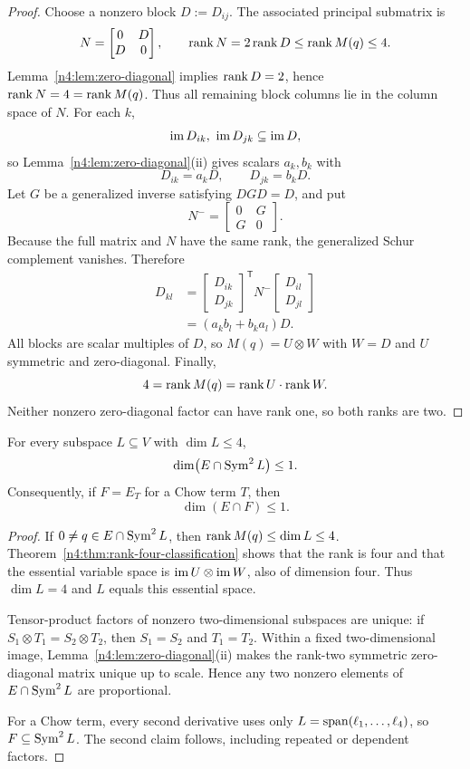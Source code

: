 \begin{proof}
Choose a nonzero block \(D:=D_{ij}\). The associated principal submatrix is
\[
  N=\begin{bmatrix}0&D\\D&0\end{bmatrix},
  \qquad \operatorname{rank} N=2\operatorname{rank} D\leq\operatorname{rank} M(q)\leq4.
\]
Lemma~\ref{n4:lem:zero-diagonal} implies \(\operatorname{rank} D=2\), hence
\(\operatorname{rank} N=4=\operatorname{rank} M(q)\). Thus all remaining block columns lie in the column
space of \(N\). For each \(k\),
\[
  \operatorname{im} D_{ik},\ \operatorname{im} D_{jk}\subseteq\operatorname{im} D,
\]
so Lemma~\ref{n4:lem:zero-diagonal}(ii) gives scalars \(a_k,b_k\) with
\[
  D_{ik}=a_kD,\qquad D_{jk}=b_kD.
\]
Let \(G\) be a generalized inverse satisfying \(DGD=D\), and put
\[
  N^-=\begin{bmatrix}0&G\\G&0\end{bmatrix}.
\]
Because the full matrix and \(N\) have the same rank, the generalized Schur
complement vanishes. Therefore
\begin{align*}
  D_{kl}
  &=\begin{bmatrix}D_{ik}\\D_{jk}\end{bmatrix}^{\mathsf T}
    N^-
    \begin{bmatrix}D_{il}\\D_{jl}\end{bmatrix}\\
  &=(a_kb_l+b_ka_l)D.
\end{align*}
All blocks are scalar multiples of \(D\), so \(M(q)=U\otimes W\) with
\(W=D\) and \(U\) symmetric and zero-diagonal. Finally,
\[
  4=\operatorname{rank} M(q)=\operatorname{rank} U\cdot\operatorname{rank} W.
\]
Neither nonzero zero-diagonal factor can have rank one, so both ranks are two.
\end{proof}

\begin{corollary}\label{n4:cor:intersection}
For every subspace \(L\subseteq V\) with \(\dim L\leq4\),
\[
  \dim\bigl(E\cap\operatorname{Sym}^2L\bigr)\leq1.
\]
Consequently, if \(F=E_T\) for a Chow term \(T\), then
\[
  \dim(E\cap F)\leq1.
\]
\end{corollary}

\begin{proof}
If \(0\neq q\in E\cap\operatorname{Sym}^2L\), then \(\operatorname{rank} M(q)\leq\dim L\leq4\).
Theorem~\ref{n4:thm:rank-four-classification} shows that the rank is four and
that the essential variable space is \(\operatorname{im} U\otimes\operatorname{im} W\), also of dimension
four. Thus \(\dim L=4\) and \(L\) equals this essential space.

Tensor-product factors of nonzero two-dimensional subspaces are unique: if
\(S_1\otimes T_1=S_2\otimes T_2\), then \(S_1=S_2\) and \(T_1=T_2\).
Within a fixed two-dimensional image, Lemma~\ref{n4:lem:zero-diagonal}(ii)
makes the rank-two symmetric zero-diagonal matrix unique up to scale. Hence
any two nonzero elements of \(E\cap\operatorname{Sym}^2L\) are proportional.

For a Chow term, every second derivative uses only
\(L=\operatorname{span}(\ell_1,\ldots,\ell_4)\), so \(F\subseteq\operatorname{Sym}^2L\). The second
claim follows, including repeated or dependent factors.
\end{proof}

